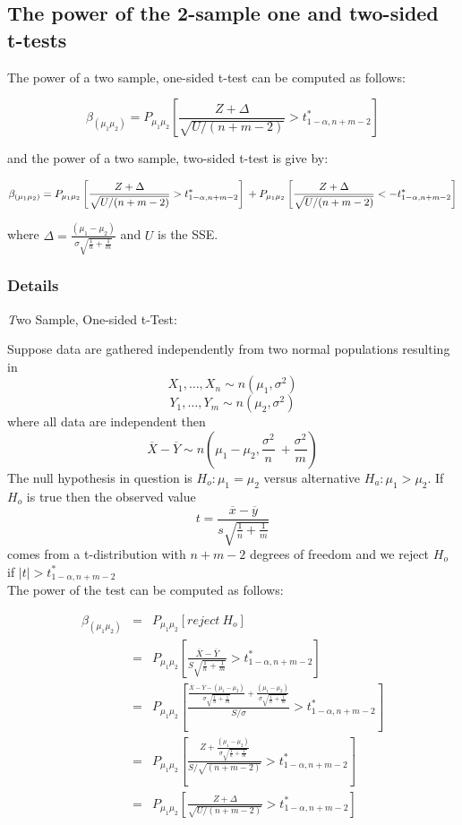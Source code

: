 \documentclass[12pt,a4paper]{article}
\theoremstyle{regla}
\theoremstyle{remark}
\theoremstyle{definition}
\theoremstyle{nonumberbreak}
\begin{document}
\subsection{The power of the 2-sample one and two-sided t-tests}
\begin{fbox}
\begin{minipage}{0.97\textwidth}
The power of a two sample, one-sided t-test can be computed as follows:

$$ \beta_{(\mu_1\mu_2)} = P_{\mu_1\mu_2}\left[ \frac{Z + \Delta}{\sqrt{U/(n+m-2)}} > t^*_{1-\alpha,n+m-2} \right] $$

and the power of a two sample, two-sided t-test is give by: 

$$\beta_{(\mu_1\mu_2)} = P_{\mu_1\mu_2}\left[ \frac{Z + \Delta}{\sqrt{U/(n+m-2)}} > t^*_{1-\alpha,n+m-2} \right]\\ 
+P_{\mu_1\mu_2}\left[ \frac{Z + \Delta}{\sqrt{U/(n+m-2)}} < -t^*_{1-\alpha,n+m-2} \right]$$

where $\Delta = \frac{(\mu_1-\mu_2)}{\sigma\sqrt{\frac{1}{n}+\frac{1}{m}}} $ and 
$U$ is the SSE.\\



\end{minipage}
\end{fbox}
\subsubsection{Details}
{\emph Two Sample, One-sided t-Test}:

Suppose data are gathered independently from two normal populations resulting in
 $$X_1, \ldots, X_n \sim n(\mu_1, \sigma^2)$$
 $$Y_1, \ldots, Y_m \sim n(\mu_2, \sigma^2)$$
where all data are independent then $$ \overline{X}-\overline{Y} \sim n(\mu_1 - \mu_2, \frac{\sigma^2}{n}\ + \frac{\sigma^2}{m})$$
The null hypothesis in question is $H_o: \mu_1 = \mu_2$ versus alternative $H_a: \mu_1 > \mu_2$.
If $H_o$ is true then the observed value
$$ t = \frac{\overline{x}-\overline{y}}{s\sqrt{\frac{1}{n}+\frac{1}{m}}} $$
comes from a t-distribution with $n+m-2$ degrees of freedom and we reject $H_o$ if $\left|t \right|> t^*_{1-\alpha,n+m-2}$\\

The power of the test can be computed as follows:

\begin{eqnarray*}
\beta_{(\mu_1\mu_2)}& = & P_{\mu_1\mu_2}\left[reject~H_o \right]\\
& = & P_{\mu_1\mu_2}\left[\frac{\overline{X}-\overline{Y}}{S\sqrt{\frac{1}{n}+\frac{1}{m}}} > t^*_{1-\alpha,n+m-2} \right]\\
& = &  P_{\mu_1\mu_2}\left[\frac{\frac{\overline{X}-\overline{Y}-(\mu_1-\mu_2)}{\sigma\sqrt{\frac{1}{n}+\frac{1}{m}}}+ \frac{(\mu_1-\mu_2)}{\sigma\sqrt{\frac{1}{n}+\frac{1}{m}}}}{S/\sigma} > t^*_{1-\alpha,n+m-2}\right]\\
& = &  P_{\mu_1\mu_2}\left[\frac{Z +\frac{(\mu_1-\mu_2)}{\sigma\sqrt{\frac{1}{n}+\frac{1}{m}}}}
{S/\sqrt{(n+m-2)}} > t^*_{1-\alpha,n+m-2} \right]\\
& = &  P_{\mu_1\mu_2}\left[ \frac{Z + \Delta}{\sqrt{U/(n+m-2)}} > t^*_{1-\alpha,n+m-2} \right]
\end{eqnarray*}
\end{document}
